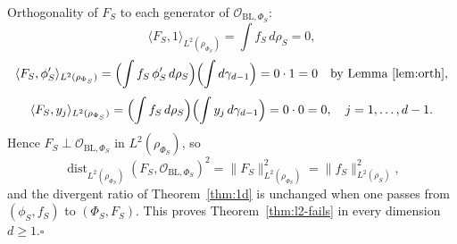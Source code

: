 \documentclass{article}
\theoremstyle{remark}
\DeclareMathOperator{\dist}{dist}
\begin{document}
Orthogonality of $F_S$ to each generator of $\mathcal O_{\mathrm{BL},\Phi_S}$:
\[
  \langle F_S,1\rangle_{L^2(\rho_{\Phi_S})}=\int f_S\,d\rho_S=0,
\]
\[
  \langle F_S,\phi'_S\rangle_{L^2(\rho_{\Phi_S})}
  =\Bigl(\int f_S\,\phi'_S\,d\rho_S\Bigr)\Bigl(\int d\gamma_{d-1}\Bigr)
  =0\cdot 1=0
  \quad\text{by Lemma~\ref{lem:orth}},
\]
\[
  \langle F_S,y_j\rangle_{L^2(\rho_{\Phi_S})}
  =\Bigl(\int f_S\,d\rho_S\Bigr)\Bigl(\int y_j\,d\gamma_{d-1}\Bigr)
  =0\cdot 0=0,
  \quad j=1,\dots,d-1.
\]
Hence $F_S\perp\mathcal O_{\mathrm{BL},\Phi_S}$ in $L^2(\rho_{\Phi_S})$, so
\[
  \dist_{L^2(\rho_{\Phi_S})}(F_S,\mathcal O_{\mathrm{BL},\Phi_S})^2
  =\|F_S\|_{L^2(\rho_{\Phi_S})}^2
  =\|f_S\|_{L^2(\rho_S)}^2,
\]
and the divergent ratio of Theorem~\ref{thm:1d} is unchanged when one passes
from $(\phi_S,f_S)$ to $(\Phi_S,F_S)$. This proves
Theorem~\ref{thm:l2-fails} in every dimension $d\ge 1$.\hfill$\square$
\end{document}
